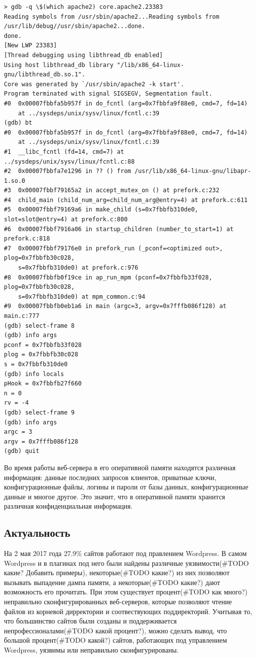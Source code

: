 \documentclass[20pt]{article}
\begin{document}
\begin{lstlisting}
> gdb -q \$(which apache2) core.apache2.23383
Reading symbols from /usr/sbin/apache2...Reading symbols from /usr/lib/debug//usr/sbin/apache2...done.
done.
[New LWP 23383]
[Thread debugging using libthread_db enabled]
Using host libthread_db library "/lib/x86_64-linux-gnu/libthread_db.so.1".
Core was generated by `/usr/sbin/apache2 -k start'.
Program terminated with signal SIGSEGV, Segmentation fault.
#0  0x00007fbbfa5b957f in do_fcntl (arg=0x7fbbfa9f88e0, cmd=7, fd=14)
    at ../sysdeps/unix/sysv/linux/fcntl.c:39
(gdb) bt
#0  0x00007fbbfa5b957f in do_fcntl (arg=0x7fbbfa9f88e0, cmd=7, fd=14)
    at ../sysdeps/unix/sysv/linux/fcntl.c:39
#1  __libc_fcntl (fd=14, cmd=7) at ../sysdeps/unix/sysv/linux/fcntl.c:88
#2  0x00007fbbfa7e1296 in ?? () from /usr/lib/x86_64-linux-gnu/libapr-1.so.0
#3  0x00007fbbf79165a2 in accept_mutex_on () at prefork.c:232
#4  child_main (child_num_arg=child_num_arg@entry=4) at prefork.c:611
#5  0x00007fbbf79169a6 in make_child (s=0x7fbbfb310de0, slot=slot@entry=4) at prefork.c:800
#6  0x00007fbbf7916a06 in startup_children (number_to_start=1) at prefork.c:818
#7  0x00007fbbf79176e0 in prefork_run (_pconf=<optimized out>, plog=0x7fbbfb30c028,
    s=0x7fbbfb310de0) at prefork.c:976
#8  0x00007fbbfb0f19ce in ap_run_mpm (pconf=0x7fbbfb33f028, plog=0x7fbbfb30c028,
    s=0x7fbbfb310de0) at mpm_common.c:94
#9  0x00007fbbfb0eb1a6 in main (argc=3, argv=0x7fffb086f128) at main.c:777
(gdb) select-frame 8
(gdb) info args
pconf = 0x7fbbfb33f028
plog = 0x7fbbfb30c028
s = 0x7fbbfb310de0
(gdb) info locals
pHook = 0x7fbbfb27f660
n = 0
rv = -4
(gdb) select-frame 9
(gdb) info args
argc = 3
argv = 0x7fffb086f128
(gdb) quit
\end{lstlisting}

Во время работы веб-сервера в его оперативной памяти находятся различная
информация: данные последних запросов клиентов, приватные ключи, конфигурационные
файлы, логины и пароли от базы данных, конфигурационные данные и многое другое.
Это значит, что в оперативной памяти хранится различная конфиденциальная информация.

\subsection{Актуальность}
На 2 мая 2017 года 27.9\% сайтов работают под правлением Wordpress.
\cite{number_of_wordpress_sites} В самом Wordpress и в плагинах под него были
найдены различные уязвимости(#TODO какие? Добавить примеры), некоторые(#TODO какие?) из них позволяют вызывать выпадение
дампа памяти, а некоторые(#TODO какие?) дают возможность его прочитать. При этом существует
процент(#TODO как много?) неправильно сконфигурированных веб-серверов, которые позволяют чтение
файлов из корневой дирректории и соотвествующих поддиректорий. Учитывая то,
что большинство сайтов были созданы и поддерживается непрофессионалами(#TODO какой процент?), можно
сделать вывод, что большой процент(#TODO какой?) сайтов, работающих под управлением Wordpress,
уязвимы или неправильно сконфигурированы.
\end{document}
